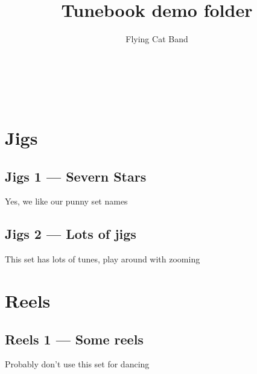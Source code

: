 \documentclass[a4paper,11pt]{article}
\begin{document}
\title{Tunebook demo folder}
\author{Flying Cat Band}

\makeatletter
\begin{titlepage}
    \begin{center}
        {\huge \bfseries  \@title }\\[2ex]
        {\LARGE  \@author}\\[50ex]
    \end{center}
\end{titlepage}
\makeatother
\thispagestyle{empty}
\newpage

\maketitle
\tableofcontents
\clearpage

\setcounter{page}{1} %
\section{Jigs}

\subsection{Jigs 1 --- Severn Stars}
Yes, we like our punny set names
\clearpage

\subsection{Jigs 2 --- Lots of jigs}
This set has lots of tunes, play around with zooming
\clearpage

\section{Reels}
\subsection{Reels 1 --- Some reels}
Probably don't use this set for dancing
\end{document}
